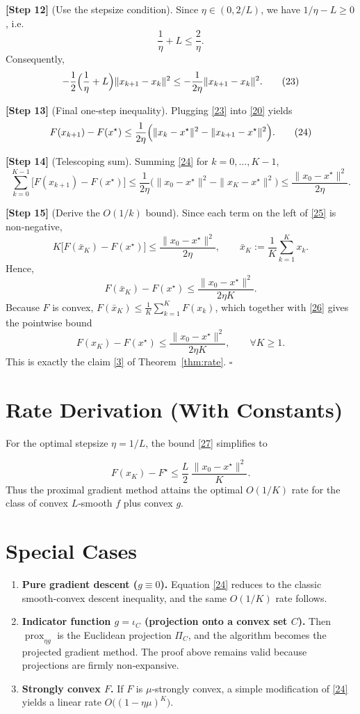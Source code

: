 \documentclass[11pt]{article}
\newcommand{\prox}{\operatorname{prox}}
\begin{document}
\noindent\textbf{[Step 12]} (Use the stepsize condition).  
Since $\eta\in(0,2/L)$, we have $1/\eta - L \ge 0$, i.e.
\[
\frac{1}{\eta}+L \le \frac{2}{\eta}.
\tag{22}
\]
Consequently,
\[
-\frac{1}{2}\Bigl(\frac{1}{\eta}+L\Bigr)\|x_{k+1}-x_{k}\|^{2}
\le -\frac{1}{2\eta}\|x_{k+1}-x_{k}\|^{2}.
\tag{23}
\]

\noindent\textbf{[Step 13]} (Final one‑step inequality).  
Plugging \eqref{23} into \eqref{20} yields
\[
F(x_{k+1})-F(x^{\star})
\le \frac{1}{2\eta}\Bigl(\|x_{k}-x^{\star}\|^{2}
      -\|x_{k+1}-x^{\star}\|^{2}\Bigr).
\tag{24}
\]

\noindent\textbf{[Step 14]} (Telescoping sum).  
Summing \eqref{24} for $k=0,\dots, K-1$,
\[
\sum_{k=0}^{K-1}\bigl[F(x_{k+1})-F(x^{\star})\bigr]
\le \frac{1}{2\eta}\bigl(\|x_{0}-x^{\star}\|^{2}-\|x_{K}-x^{\star}\|^{2}\bigr)
\le \frac{\|x_{0}-x^{\star}\|^{2}}{2\eta}.
\tag{25}
\]

\noindent\textbf{[Step 15]} (Derive the $O(1/k)$ bound).  
Since each term on the left of \eqref{25} is non‑negative,
\[
K\bigl[F(\bar{x}_{K})-F(x^{\star})\bigr]
\le \frac{\|x_{0}-x^{\star}\|^{2}}{2\eta},
\qquad 
\bar{x}_{K}:=\frac{1}{K}\sum_{k=1}^{K}x_{k}.
\]
Hence,
\[
F(\bar{x}_{K})-F(x^{\star})\le\frac{\|x_{0}-x^{\star}\|^{2}}{2\eta K}.
\tag{26}
\]
Because $F$ is convex, $F(\bar{x}_{K})\le\frac{1}{K}\sum_{k=1}^{K}F(x_{k})$, which together with \eqref{26} gives the pointwise bound
\[
F(x_{K})-F(x^{\star})\le\frac{\|x_{0}-x^{\star}\|^{2}}{2\eta K},
\qquad\forall K\ge1.
\tag{27}
\]
This is exactly the claim \eqref{3} of Theorem~\ref{thm:rate}. \hfill $\square$

\section*{Rate Derivation (With Constants)}
For the optimal stepsize $\eta=1/L$, the bound \eqref{27} simplifies to  

\[
F(x_{K})-F^{\star}\le \frac{L}{2}\,\frac{\|x_{0}-x^{\star}\|^{2}}{K}.
\tag{28}
\]
Thus the proximal gradient method attains the optimal $O(1/K)$ rate for the class of convex $L$‑smooth $f$ plus convex $g$.

\section*{Special Cases}
\begin{enumerate}
\item \textbf{Pure gradient descent ($g\equiv0$).}  
Equation \eqref{24} reduces to the classic smooth‑convex descent inequality, and the same $O(1/K)$ rate follows.
\item \textbf{Indicator function $g=\iota_{C}$ (projection onto a convex set $C$).}  
Then $\prox_{\eta g}$ is the Euclidean projection $\Pi_{C}$, and the algorithm becomes the projected gradient method. The proof above remains valid because projections are firmly non‑expansive.
\item \textbf{Strongly convex $F$.}  
If $F$ is $\mu$‑strongly convex, a simple modification of \eqref{24} yields a linear rate $O\bigl((1-\eta\mu)^{K}\bigr)$.
\end{enumerate}
\end{document}
